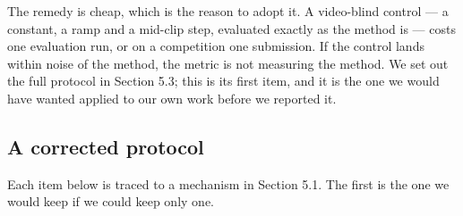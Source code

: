 The remedy is cheap, which is the reason to adopt it. A video-blind control ---
a constant, a ramp and a mid-clip step, evaluated exactly as the method is ---
costs one evaluation run, or on a competition one submission. If the control
lands within noise of the method, the metric is not measuring the method. We
set out the full protocol in Section 5.3; this is its first item, and it is the
one we would have wanted applied to our own work before we reported it.

\subsection{A corrected protocol}

Each item below is traced to a mechanism in Section 5.1. The first is the one we would keep if we could keep only one.

